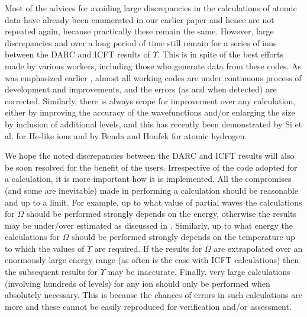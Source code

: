 \documentclass[fleqn]{article}
\begin{document}
Most of the advices for avoiding large discrepancies in the calculations of atomic data have already been enumerated in our earlier paper \cite{fst} and hence are not repeated again, because practically these remain the same. However,  large discrepancies and over a long period of time still remain for a series of ions between the DARC and ICFT results of $\Upsilon$. This is in spite of the best efforts made by various  workers, including those who generate data from these codes. As was emphasized earlier \cite{fst}, almost all working codes are under continuous process of development and improvements, and the errors (as and when detected) are corrected. Similarly, there is always scope for improvement over any calculation, either by improving the accuracy of the wavefunctions and/or enlarging the size by inclusion of additional levels, and this has recently been demonstrated by Si et al. \cite{si1,si2} for He-like ions and by Benda and Houfek \cite{jak} for atomic hydrogen.

We hope the noted discrepancies between the DARC and ICFT results will also be soon resolved  for the benefit of the users. Irrespective of the code adopted for a calculation,  it is more important how it is implemented.  All the compromises (and some are inevitable)  made in performing a calculation should be reasonable and up to a limit. For example, up to what value of partial waves the calculations for $\Omega$ should be performed strongly depends on the energy, otherwise the results may be under/over estimated as discussed in \cite{mgv, nixi, w66a}.   Similarly, up to what energy the calculations for $\Omega$ should be performed strongly depends on the temperature up to which the values of $\Upsilon$ are required. If the results for $\Omega$ are extrapolated over an enormously large energy range (as often is the case with ICFT calculations) then the subsequent results for $\Upsilon$ may be inaccurate. Finally, very large calculations (involving hundreds of levels) for any ion should only be performed when absolutely necessary. This is because the chances of errors in such calculations are more and these cannot be easily reproduced for verification and/or assessment.
\end{document}
